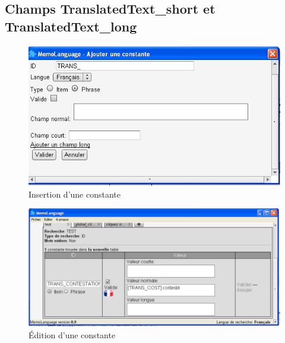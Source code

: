     \subsection{Champs TranslatedText\_short et TranslatedText\_long}
    \label{nouveauxScreens}
        \begin{figure}[H]
        \centering
        \includegraphics[width=16cm]{images/annexes/resultats/nouvelleInsertion.jpg} 
        \caption{Insertion d'une constante}
        \label{champCourtLong}
    \end{figure}
    \begin{figure}[H]
        \centering
        \includegraphics[width=16cm]{images/annexes/resultats/nouvelleEdition.jpg}
        \caption{\'Edition d'une constante}
    \end{figure}

